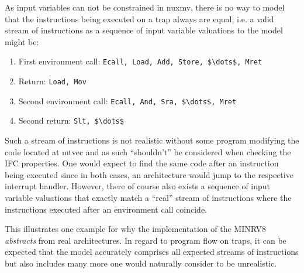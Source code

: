 As input variables can not be constrained in \gls{nuxmv}, there is no way to model that the instructions being executed on a trap always are equal, i.e. a valid stream of instructions as a sequence of input variable valuations to the model might be:
\begin{enumerate}
    \item First environment call: \lstinline[language=minrv8,mathescape=true]{Ecall, Load, Add, Store, $\dots$, Mret}
    \item Return: \lstinline[language=minrv8,mathescape=true]{Load, Mov}
    \item Second environment call: \lstinline[language=minrv8,mathescape=true]{Ecall, And, Sra, $\dots$, Mret}
    \item Second return: \lstinline[language=minrv8,mathescape=true]{Slt, $\dots$}
\end{enumerate}

Such a stream of instructions is not realistic without some program modifying the code located at \gls{mtvec} and as such \enquote{shouldn't} be considered when checking the IFC properties.
One would expect to find the same code after an  instruction being executed since in both cases, an architecture would jump to the respective interrupt handler.
However, there of course also exists a sequence of input variable valuations that exactly match a \enquote{real} stream of instructions where the instructions executed after an environment call coincide.

This illustrates one example for why the implementation of the MINRV8 \textit{abstracts} from real architectures.
In regard to program flow on traps, it can be expected that the model accurately comprises all expected streams of instructions but also includes many more one would naturally consider to be unrealistic.

